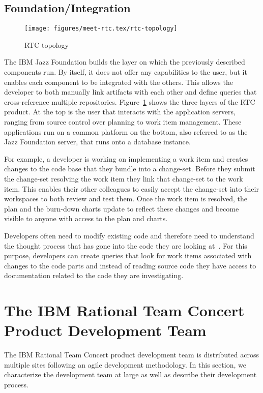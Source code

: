 \subsection{Foundation/Integration}
\begin{figure}[t]
\centering
\texttt{[image: figures/meet-rtc.tex/rtc-topology]}
\caption{RTC topology}
\label{fig:rtctopology}
\end{figure}
The IBM Jazz Foundation builds the layer on which the previously described components run.
By itself, it does not offer any capabilities to the user, but it enables each component to be integrated with the others. 
This allows the developer to both manually link artifacts with each other and define queries that cross-reference multiple repositories.
Figure~\ref{fig:rtctopology} shows the three layers of the RTC product.
At the top is the user that interacts with the application servers, ranging from source control over planning to work item management.
These applications run on a common platform on the bottom, also referred to as the Jazz Foundation server, that runs onto a database instance.

For example, a developer is working on implementing a work item and creates changes to the code base that they bundle into a change-set.
Before they submit the change-set resolving the work item they link that change-set to the work item.
This enables their other colleagues to easily accept the change-set into their workspaces to both review and test them.
Once the work item is resolved, the plan and the burn-down charts update to reflect these changes and become visible to anyone with access to the plan and charts.

Developers often need to modify existing code and therefore need to understand the thought process that has gone into the code they are looking at~\cite{vonmayrhauser:ieeecomputer:1995}.
For this purpose, developers can create queries that look for work items associated with changes to the code parts and instead of reading source code they have access to documentation related to the code they are investigating.


\section{The IBM Rational Team Concert Product Development Team}
The IBM Rational Team Concert product development team is distributed across multiple sites following an agile development methodology.
In this section, we characterize the development team at large as well as describe their development process.

